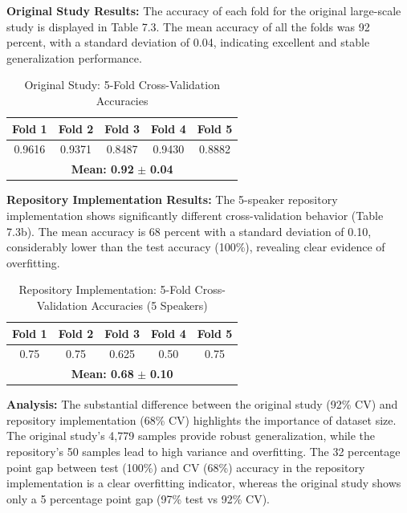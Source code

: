\documentclass[11pt,twoside,openany]{book}
\begin{document}
\textbf{Original Study Results:} The accuracy of each fold for the original large-scale study is displayed in Table 7.3. The mean accuracy of all the folds was 92 percent, with a standard deviation of 0.04, indicating excellent and stable generalization performance.

\begin{table}[h!]
    \centering
    \begin{tabular}{|c|c|c|c|c|} \hline
         Fold 1&     Fold 2&Fold 3&Fold 4&Fold 5\\ \hline
         0.9616&
       0.9371&0.8487&0.9430&0.8882 \\ \hline
         \multicolumn{5}{|c|}{\textbf{Mean: 0.92} $\pm$ \textbf{0.04}}\\ \hline
       \end{tabular}
    \caption{Original Study: 5-Fold Cross-Validation Accuracies}
    \label{tab:kfold_accuracy_original}
\end{table}

\textbf{Repository Implementation Results:} The 5-speaker repository implementation shows significantly different cross-validation behavior (Table 7.3b). The mean accuracy is 68 percent with a standard deviation of 0.10, considerably lower than the test accuracy (100\%), revealing clear evidence of overfitting.

\begin{table}[h!]
    \centering
    \begin{tabular}{|c|c|c|c|c|} \hline
         Fold 1 & Fold 2 & Fold 3 & Fold 4 & Fold 5\\ \hline
         0.75 & 0.75 & 0.625 & 0.50 & 0.75 \\ \hline
         \multicolumn{5}{|c|}{\textbf{Mean: 0.68} $\pm$ \textbf{0.10}}\\ \hline
    \end{tabular}
    \caption{Repository Implementation: 5-Fold Cross-Validation Accuracies (5 Speakers)}
    \label{tab:kfold_accuracy_repo}
\end{table}

\textbf{Analysis:} The substantial difference between the original study (92\% CV) and repository implementation (68\% CV) highlights the importance of dataset size. The original study's 4,779 samples provide robust generalization, while the repository's 50 samples lead to high variance and overfitting. The 32 percentage point gap between test (100\%) and CV (68\%) accuracy in the repository implementation is a clear overfitting indicator, whereas the original study shows only a 5 percentage point gap (97\% test vs 92\% CV).
\end{document}
